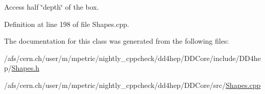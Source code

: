 Access half \char`\"{}depth\char`\"{} of the box. 



Definition at line 198 of file Shapes.\+cpp.



The documentation for this class was generated from the following files\+:\begin{DoxyCompactItemize}
\item 
/afs/cern.\+ch/user/m/mpetric/nightly\+\_\+cppcheck/dd4hep/\+D\+D\+Core/include/\+D\+D4hep/\hyperlink{_shapes_8h}{Shapes.\+h}\item 
/afs/cern.\+ch/user/m/mpetric/nightly\+\_\+cppcheck/dd4hep/\+D\+D\+Core/src/\hyperlink{_shapes_8cpp}{Shapes.\+cpp}\end{DoxyCompactItemize}

